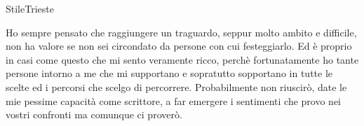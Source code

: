 \documentclass[cucitura%
,12pt%
]{toptesi}
\begin{document}
%



\expandafter\ifx\csname StileTrieste\endcsname\relax
    \frontespizio
\else
    \paginavuota
    \tomo
\fi









\indici

\listoffigures

\listoftables

\lstlistoflistings

\clearpage\pagestyle{empty}\mbox{}\clearpage


\mainmatter











\ringraziamenti

Ho sempre pensato che raggiungere un traguardo, seppur molto ambito e difficile, non ha valore se non sei circondato da persone con cui festeggiarlo. Ed è proprio
in casi come questo che mi sento veramente ricco, perchè fortunatamente ho tante persone intorno a me che mi supportano e sopratutto sopportano in tutte le scelte ed i percorsi che scelgo 
di percorrere. Probabilmente non riuscirò, date le mie pessime capacità come scrittore, a far emergere i sentimenti che provo nei vostri confronti ma comunque ci proverò.
\end{document}
